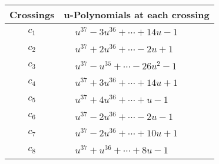 \documentclass[1p]{elsarticle_modified}
\theoremstyle{definition}
\begin{document}
\begin{tabular}{m{50pt}|m{274pt}}
Crossings & \hspace{64pt}u-Polynomials at each crossing \\
\hline $$\begin{aligned}c_{1}\end{aligned}$$&$\begin{aligned}
&u^{37}-3 u^{36}+\cdots+14 u-1
\end{aligned}$\\
\hline $$\begin{aligned}c_{2}\end{aligned}$$&$\begin{aligned}
&u^{37}+2 u^{36}+\cdots-2 u+1
\end{aligned}$\\
\hline $$\begin{aligned}c_{3}\end{aligned}$$&$\begin{aligned}
&u^{37}- u^{35}+\cdots-26 u^2-1
\end{aligned}$\\
\hline $$\begin{aligned}c_{4}\end{aligned}$$&$\begin{aligned}
&u^{37}+3 u^{36}+\cdots+14 u+1
\end{aligned}$\\
\hline $$\begin{aligned}c_{5}\end{aligned}$$&$\begin{aligned}
&u^{37}+4 u^{36}+\cdots+u-1
\end{aligned}$\\
\hline $$\begin{aligned}c_{6}\end{aligned}$$&$\begin{aligned}
&u^{37}-2 u^{36}+\cdots-2 u-1
\end{aligned}$\\
\hline $$\begin{aligned}c_{7}\end{aligned}$$&$\begin{aligned}
&u^{37}-2 u^{36}+\cdots+10 u+1
\end{aligned}$\\
\hline $$\begin{aligned}c_{8}\end{aligned}$$&$\begin{aligned}
&u^{37}+u^{36}+\cdots+8 u-1
\end{aligned}$\\

\end{tabular}
\end{document}
